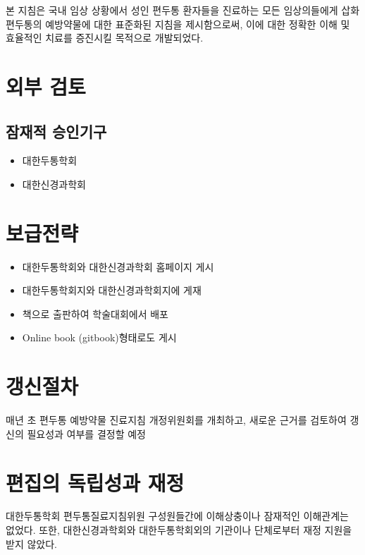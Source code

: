 \documentclass[]{book}
\providecommand{\tightlist}{%
  \setlength{\itemsep}{0pt}\setlength{\parskip}{0pt}}
\begin{document}
본 지침은 국내 임상 상황에서 성인 편두통 환자들을 진료하는 모든 임상의들에게 삽화편두통의 예방약물에 대한 표준화된 지침을 제시함으로써, 이에 대한 정확한 이해 및 효율적인 치료를 증진시킬 목적으로 개발되었다.

\hypertarget{section-43}{%
\section{외부 검토}\label{section-43}}

\hypertarget{section-44}{%
\subsection*{잠재적 승인기구}\label{section-44}}

\begin{itemize}
\tightlist
\item
  대한두통학회
\item
  대한신경과학회
\end{itemize}

\hypertarget{section-45}{%
\section{보급전략}\label{section-45}}

\begin{itemize}
\item
  대한두통학회와 대한신경과학회 홈페이지 게시
\item
  대한두통학회지와 대한신경과학회지에 게재
\item
  책으로 출판하여 학술대회에서 배포
\item
  Online book (gitbook)형태로도 게시
\end{itemize}

\hypertarget{section-46}{%
\section{갱신절차}\label{section-46}}

매년 초 편두통 예방약물 진료지침 개정위원회를 개최하고, 새로운 근거를 검토하여 갱신의 필요성과 여부를 결정할 예정

\hypertarget{section-47}{%
\section{편집의 독립성과 재정}\label{section-47}}

대한두통학회 편두통질료지침위원 구성원들간에 이해상충이나 잠재적인 이해관계는 없었다. 또한, 대한신경과학회와 대한두통학회외의 기관이나 단체로부터 재정 지원을 받지 않았다.
\end{document}
